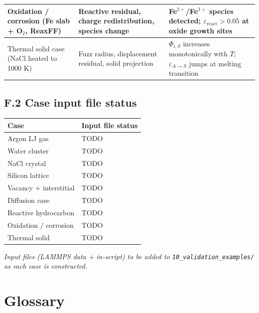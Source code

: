 \documentclass[11pt, a4paper, oneside]{article}
\newcommand{\FuzzRatio}{\Phi_{i,S}}
\begin{document}
\begin{appendices}
\begin{longtable}{p{4.5cm} p{4.5cm} p{5.5cm}}
  Oxidation / corrosion\newline
  (Fe slab + O$_2$, ReaxFF)
  &
  Reactive residual, charge redistribution,
  species change
  &
  Fe$^{2+}$/Fe$^{3+}$ species detected;
  $\varepsilon_{\mathrm{react}} > 0.05$ at oxide growth sites \\
  \midrule

  Thermal solid case\newline
  (NaCl heated to 1000 K)
  &
  Fuzz radius, displacement residual, solid projection
  &
  $\FuzzRatio$ increases monotonically with $T$;
  $\varepsilon_{A \to S}$ jumps at melting transition \\
  \midrule

  \bottomrule
\end{longtable}

\subsection*{F.2 Case input file status}

\begin{tabular}{ll}
  \toprule
  Case & Input file status \\
  \midrule
  Argon LJ gas            & TODO \\
  Water cluster           & TODO \\
  NaCl crystal            & TODO \\
  Silicon lattice         & TODO \\
  Vacancy + interstitial  & TODO \\
  Diffusion case          & TODO \\
  Reactive hydrocarbon    & TODO \\
  Oxidation / corrosion   & TODO \\
  Thermal solid           & TODO \\
  \bottomrule
\end{tabular}

\textit{Input files (LAMMPS data + in-script) to be added to
\texttt{10\_validation\_examples/} as each case is constructed.}

\end{appendices}

\section*{Glossary}
\label{sec:glossary}
\end{document}
